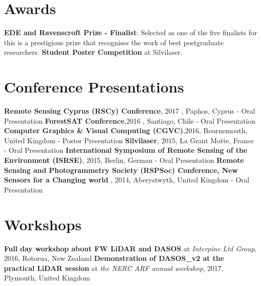 \documentclass[11pt,nofootinbib]{report}
\begin{document}
	
	\section{Awards}
		\textbf{EDE and Ravenscroft Prize - Finalist}: Selected as one of the five finalists for this is a prestigious prize that recognises the work of best postgraduate researchers.\newline
		\textbf{Student Poster Competition} at Silvilaser.
		
	
	\section{Conference Presentations}
	    \textbf{Remote Sensing Cyprus (RSCy) Conference},  2017 , Paphos, Cyprus - Oral Presentation \newline
		\textbf{ForestSAT Conference},2016 , Santiago, Chile - Oral Presentation \newline
		\textbf{Computer Graphics \& Visual Computing (CGVC)},2016, Bournemouth, United Kingdom - Poster Presentation \newline
		\textbf{Silvilaser}, 2015, La Grant Motte, France - Oral Presentation \newline
		\textbf{International Symposium of Remote Sensing of the Environment 	(ISRSE)}, 2015, Berlin, German - Oral Presentation\newline
		\textbf{Remote Sensing and Photogrammetry Society (RSPSoc) Conference, New Sensors for a Changing world} , 2014, Aberystwyth, United Kingdom - Oral Presentation \newline
	
	 
	\section{Workshops}
		\textbf{Full day workshop about FW LiDAR and DASOS} at \textit{Interpine Ltd Group}, 2016, Rotorua, New Zealand \newline
		\textbf{Demonstration of DASOS\_v2 at the practical LiDAR session} at \textit{ the NERC ARF annual workshop}, 2017, Plymouth, United Kingdom \newline


	\setcounter{secnumdepth}{1}
   	\setcounter{tocdepth}{1}
    \tableofcontents	 

		\newpage  
	\cleardoublepage
	\listoffigures
	
	
		
		
	\setcounter{secnumdepth}{4}		
\end{document}
